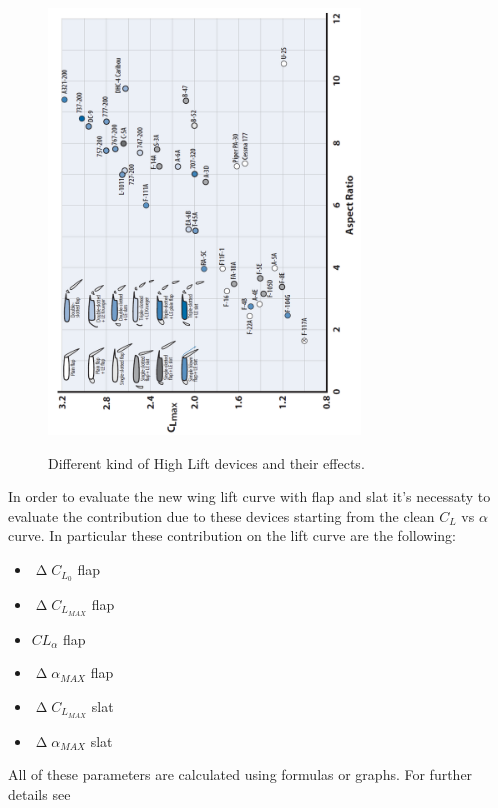 \begin{figure}[H]
\centering
{\includegraphics[height=11.3cm, angle =-90 ]{Immagini/highlift.png}} 
\caption{Different kind of High Lift devices and their effects.}
\label{fig:hl}
\end{figure}

In order to evaluate the new wing lift curve with flap and slat it's necessaty to evaluate the contribution due to these devices starting from the clean $C_L$ vs $\alpha$ curve. In particular these contribution on the lift curve are the following:

\begin{itemize}
\item $\upDelta C_{L_0} $ flap 
\item $\upDelta C_{L_{MAX}} $ flap
\item $CL_{\alpha}$ flap 
\item $\upDelta \alpha_{MAX} $ flap
\item $\upDelta C_{L_{MAX}} $ slat
\item $\upDelta \alpha_{MAX} $ slat
\end{itemize}


All of these parameters are calculated using formulas or graphs. For further details see \cite{nicolai2010fundamentals}

